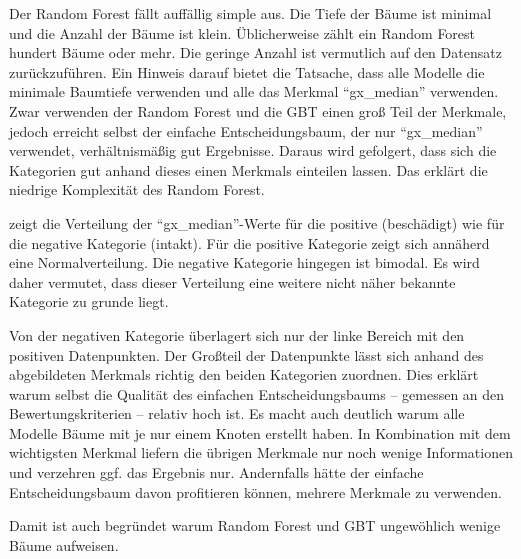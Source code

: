 Der Random Forest fällt auffällig simple aus. Die Tiefe der Bäume ist minimal und die Anzahl der Bäume ist klein. Üblicherweise zählt ein Random Forest hundert Bäume oder mehr. Die geringe Anzahl ist vermutlich auf den Datensatz zurückzuführen. Ein Hinweis darauf bietet die Tatsache, dass alle Modelle die minimale Baumtiefe verwenden und alle das Merkmal \enquote{gx\_median} verwenden. Zwar verwenden der Random Forest und die GBT einen groß Teil der Merkmale, jedoch erreicht selbst der einfache Entscheidungsbaum, der nur \enquote{gx\_median} verwendet, verhältnismäßig gut Ergebnisse. Daraus wird gefolgert, dass sich die Kategorien gut anhand dieses einen Merkmals einteilen lassen. Das erklärt die niedrige Komplexität des Random Forest.

 zeigt die Verteilung der \enquote{gx\_median}-Werte für die positive (beschädigt) wie für die negative Kategorie (intakt). Für die positive Kategorie zeigt sich annäherd eine Normalverteilung. Die negative Kategorie hingegen ist bimodal. Es wird daher vermutet, dass dieser Verteilung eine weitere nicht näher bekannte Kategorie zu grunde liegt.

Von der negativen Kategorie überlagert sich nur der linke Bereich mit den positiven Datenpunkten. Der Großteil der Datenpunkte lässt sich anhand des abgebildeten Merkmals richtig den beiden Kategorien zuordnen. Dies erklärt warum selbst die Qualität des einfachen Entscheidungsbaums -- gemessen an den Bewertungskriterien -- relativ hoch ist. Es macht auch deutlich warum alle Modelle Bäume mit je nur einem Knoten erstellt haben. In Kombination mit dem wichtigsten Merkmal liefern die übrigen Merkmale nur noch wenige Informationen und verzehren ggf. das Ergebnis nur. Andernfalls hätte der einfache Entscheidungsbaum davon profitieren können, mehrere Merkmale zu verwenden.

Damit ist auch begründet warum Random Forest und GBT ungewöhlich wenige Bäume aufweisen.